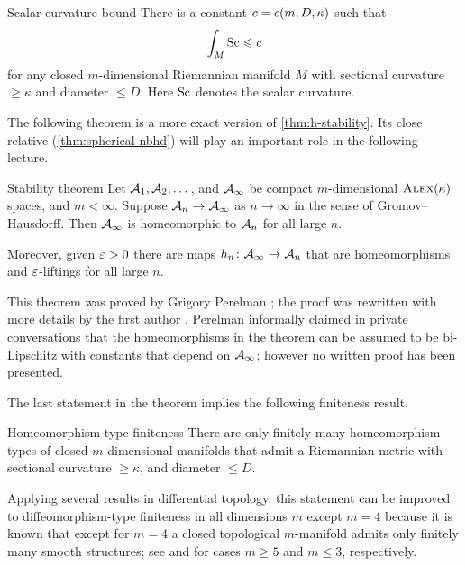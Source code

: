 \begin{thm}{Scalar curvature bound}
There is a constant $c=c(m,D,\kappa)$ such that 
\[\int_M\mathrm{Sc}\leqslant c\]
for any closed $m$-dimensional Riemannian manifold $M$ with sectional curvature $\ge \kappa$ and diameter $\le D$.
Here $\mathrm{Sc}$ denotes the scalar curvature.
\end{thm}

The following theorem is a more exact version of \ref{thm:h-stability}.
Its close relative (\ref{thm:spherical-nbhd}) will play an important role in the following lecture.

\begin{thm}{Stability theorem}\label{thm:stability}
Let $\mathcal{A}_1,\mathcal{A}_2,\dots$, and $\mathcal{A}_\infty$ be compact $m$-dimensional $\textsc{Alex}(\kappa)$ spaces, and $m<\infty$.
Suppose $\mathcal{A}_n\to \mathcal{A}_\infty$ as $n\to \infty$ in the sense of Gromov--Hausdorff.
Then $\mathcal{A}_\infty$ is homeomorphic to $\mathcal{A}_n$ for all large $n$.

Moreover, given $\varepsilon>0$ there are maps $h_n\colon\mathcal{A}_\infty\to \mathcal{A}_n$ that are homeomorphisms and $\varepsilon$-liftings for all large $n$.
\end{thm}

This theorem was proved by Grigory Perelman \cite{perelman1991};
the proof was rewritten with more details by the first author \cite{kapovitch}.
Perelman  informally claimed in private conversations that the homeomorphisms in the theorem can be assumed to be bi-Lipschitz with constants that depend on $\mathcal{A}_\infty$;
however no written proof has been presented.

The last statement in the theorem implies the following finiteness result.

\begin{thm}{Homeomorphism-type finiteness}
There are only finitely many homeomorphism types of closed $m$-dimensional manifolds that admit a Riemannian metric with sectional curvature $\ge \kappa$, and diameter $\le D$.
\end{thm}

Applying several results in differential topology, this statement can be improved to diffeomorphism-type finiteness in all dimensions $m$ except $m=4$ because it is known that except for $m=4$ a closed topological $m$-manifold admits only finitely many smooth structures; see \cite{kirby-siebenmann} and  \cite{moise,thurston} for cases $m\ge 5$ and $m\le 3$, respectively.


